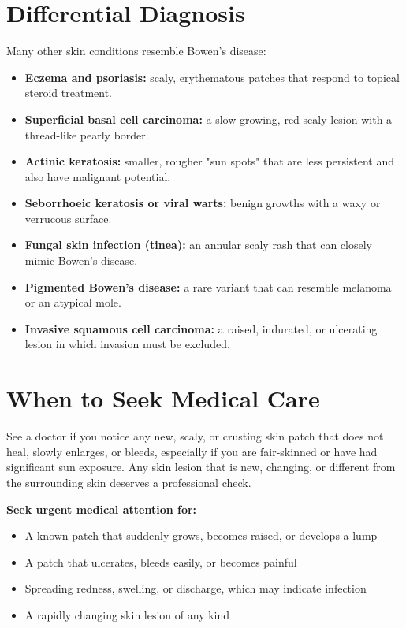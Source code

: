 \section*{Differential Diagnosis}
Many other skin conditions resemble Bowen's disease:
\begin{itemize}
    \item \textbf{Eczema and psoriasis:} scaly, erythematous patches that respond to topical steroid treatment.
    \item \textbf{Superficial basal cell carcinoma:} a slow-growing, red scaly lesion with a thread-like pearly border.
    \item \textbf{Actinic keratosis:} smaller, rougher "sun spots" that are less persistent and also have malignant potential.
    \item \textbf{Seborrhoeic keratosis or viral warts:} benign growths with a waxy or verrucous surface.
    \item \textbf{Fungal skin infection (tinea):} an annular scaly rash that can closely mimic Bowen's disease.
    \item \textbf{Pigmented Bowen's disease:} a rare variant that can resemble melanoma or an atypical mole.
    \item \textbf{Invasive squamous cell carcinoma:} a raised, indurated, or ulcerating lesion in which invasion must be excluded.
\end{itemize}

\section*{When to Seek Medical Care}
See a doctor if you notice any new, scaly, or crusting skin patch that does not heal, slowly enlarges, or bleeds, especially if you are fair-skinned or have had significant sun exposure. Any skin lesion that is new, changing, or different from the surrounding skin deserves a professional check.

\textbf{Seek urgent medical attention for:}
\begin{itemize}
    \item A known patch that suddenly grows, becomes raised, or develops a lump
    \item A patch that ulcerates, bleeds easily, or becomes painful
    \item Spreading redness, swelling, or discharge, which may indicate infection
    \item A rapidly changing skin lesion of any kind
\end{itemize}

